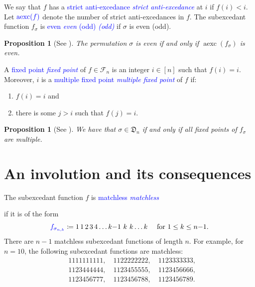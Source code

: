 \documentclass[reqno]{amsart}
\newtheorem{proposition}[theorem]{Proposition}
\theoremstyle{definition}
\newcommand{\defin}[1]{%
\relax\ifmmode%
\textcolor{blue}{#1}%
\else\textcolor{blue}{\emph{#1}}%
\fi%
}
\newcommand{\dArr}{\mathfrak{D}}
\newcommand{\SEF}{\mathcal{F}}  %
\DeclareMathOperator{\aexc}{aexc} %
\begin{document}
We say that $f$ has a \defin{strict anti-excedance} at $i$ if $f(i)<i$.
Let $\defin{\aexc(f)}$ denote the number of strict anti-excedances in $f$.
The subexcedant function $f_\sigma$
is \defin{even} \defin{(odd)} if $\sigma$ is even (odd).
\begin{proposition}[{See \cite[Prop. 4.1]{MantaciRakotondrajao2001}}]\label{prop:evenSEF}
The permutation $\sigma$ is even if and only if $\aexc(f_{\sigma})$
is even.
\end{proposition}


A \defin{fixed point} of $f \in \SEF_n$ is an integer $i \in [n]$ such that $f(i)=i$.
Moreover, $i$ is a \defin{multiple fixed point} of $f$ if:
\begin{enumerate}
	\item $f(i)=i$ and 
	\item there is some $j>i$ such that $f(j)=i$.
\end{enumerate}

\begin{proposition}[{See \cite[Prop. 3.8]{MantaciRakotondrajao2001}}]\label{prop:derangmentSEF}
We have that $\sigma \in \dArr_n$ if and only if all
fixed points of $f_{\sigma}$ are multiple.
\end{proposition}





\section{An involution and its consequences}\label{sec:involution}


The subexcedant function $f$ is \defin{matchless}
if it is of the form
\[
\defin{ f_{\sigma_{n,k}} } \coloneqq 1\,1\,2\,3\,4\dotsc k{-}1\,\,k\,\,k\dotsc k \quad \text{  for $1\leq k \leq n{-}1$}.
\]
There are $n-1$ matchless subexcedant functions of length $n$.
For example, for $n=10$, the following subexcedant functions are matchless:
\begin{align*}
 &1111111111, \quad 1122222222, \quad 1123333333, \\
 &1123444444, \quad 1123455555, \quad 1123456666, \\
 &1123456777, \quad 1123456788, \quad 1123456789. 
\end{align*}
\end{document}
